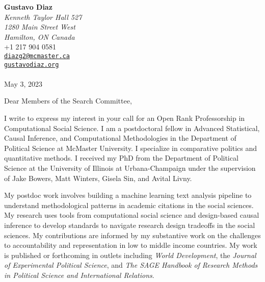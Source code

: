 \documentclass[
  11pt,
]{article}
\author{Gustavo Diaz}
\date{May 3, 2023}
\date{}
\begin{document}
\hfill
\begin{minipage}[t]{1\textwidth}
\raggedleft%
{\bfseries Gustavo Diaz }\\[.35ex]
\emph{\small Kenneth Taylor Hall 527\\
1280 Main Street West\\
Hamilton, ON Canada} \\[.35ex]
\faPhone \hspace{1 mm} \small{+1 217 904 0581} \\ 
\faEnvelopeO \hspace{1 mm} \small{\tt \href{mailto:diazg2@mcmaster.ca}{\nolinkurl{diazg2@mcmaster.ca}}} \\ 
\faGlobe \hspace{1 mm} \small{\href{http://gustavodiaz.org}{\tt gustavodiaz.org}}\\ 
\hspace{1cm} \\
 May 3, 2023 \\ 
\end{minipage}


\vspace*{1em}

Dear Members of the Search Committee,

\vspace*{1em}

 

% 
% 

% 
I write to express my interest in your call for an Open Rank
Professorship in Computational Social Science. I am a postdoctoral
fellow in Advanced Statistical, Causal Inference, and Computational
Methodologies in the Department of Political Science at McMaster
University. I specialize in comparative politics and quantitative
methods. I received my PhD from the Department of Political Science at
the University of Illinois at Urbana-Champaign under the supervision of
Jake Bowers, Matt Winters, Gisela Sin, and Avital Livny.

My postdoc work involves building a machine learning text analysis
pipeline to understand methodological patterns in academic citations in
the social sciences. My research uses tools from computational social
science and design-based causal inference to develop standards to
navigate research design tradeoffs in the social sciences. My
contributions are informed by my substantive work on the challenges to
accountability and representation in low to middle income countries. My
work is published or forthcoming in outlets including \emph{World
Development}, the \emph{Journal of Experimental Political Science}, and
\emph{The SAGE Handbook of Research Methods in Political Science and
International Relations}.
\end{document}
